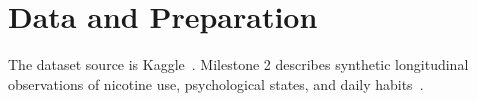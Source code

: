 \section{Data and Preparation}
The dataset source is Kaggle~\cite{dataset}. Milestone 2 describes synthetic
longitudinal observations of nicotine use, psychological states, and daily
habits~\cite{proposal}.

